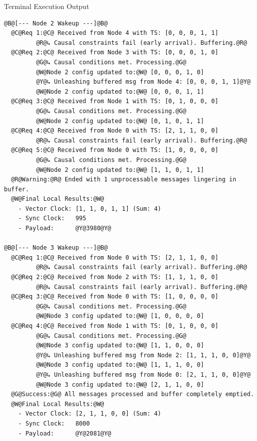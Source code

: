 \documentclass[11pt]{article}
\begin{document}
\begin{terminalbox}{Terminal Execution Output}
\begin{lstlisting}[style=terminalstyle]
@B@[--- Node 2 Wakeup ---]@B@
  @C@Req 1:@C@ Received from Node 4 with TS: [0, 0, 0, 1, 1]
         @R@↳ Causal constraints fail (early arrival). Buffering.@R@
  @C@Req 2:@C@ Received from Node 3 with TS: [0, 0, 0, 1, 0]
         @G@↳ Causal conditions met. Processing.@G@
         @W@Node 2 config updated to:@W@ [0, 0, 0, 1, 0]
         @Y@↳ Unleashing buffered msg from Node 4: [0, 0, 0, 1, 1]@Y@
         @W@Node 2 config updated to:@W@ [0, 0, 0, 1, 1]
  @C@Req 3:@C@ Received from Node 1 with TS: [0, 1, 0, 0, 0]
         @G@↳ Causal conditions met. Processing.@G@
         @W@Node 2 config updated to:@W@ [0, 1, 0, 1, 1]
  @C@Req 4:@C@ Received from Node 0 with TS: [2, 1, 1, 0, 0]
         @R@↳ Causal constraints fail (early arrival). Buffering.@R@
  @C@Req 5:@C@ Received from Node 0 with TS: [1, 0, 0, 0, 0]
         @G@↳ Causal conditions met. Processing.@G@
         @W@Node 2 config updated to:@W@ [1, 1, 0, 1, 1]
  @R@Warning:@R@ Ended with 1 unprocessable messages lingering in buffer.
  @W@Final Local Results:@W@
    - Vector Clock: [1, 1, 0, 1, 1] (Sum: 4)
    - Sync Clock:   995
    - Payload:      @Y@3980@Y@

@B@[--- Node 3 Wakeup ---]@B@
  @C@Req 1:@C@ Received from Node 0 with TS: [2, 1, 1, 0, 0]
         @R@↳ Causal constraints fail (early arrival). Buffering.@R@
  @C@Req 2:@C@ Received from Node 2 with TS: [1, 1, 1, 0, 0]
         @R@↳ Causal constraints fail (early arrival). Buffering.@R@
  @C@Req 3:@C@ Received from Node 0 with TS: [1, 0, 0, 0, 0]
         @G@↳ Causal conditions met. Processing.@G@
         @W@Node 3 config updated to:@W@ [1, 0, 0, 0, 0]
  @C@Req 4:@C@ Received from Node 1 with TS: [0, 1, 0, 0, 0]
         @G@↳ Causal conditions met. Processing.@G@
         @W@Node 3 config updated to:@W@ [1, 1, 0, 0, 0]
         @Y@↳ Unleashing buffered msg from Node 2: [1, 1, 1, 0, 0]@Y@
         @W@Node 3 config updated to:@W@ [1, 1, 1, 0, 0]
         @Y@↳ Unleashing buffered msg from Node 0: [2, 1, 1, 0, 0]@Y@
         @W@Node 3 config updated to:@W@ [2, 1, 1, 0, 0]
  @G@Success:@G@ All messages processed and buffer completely emptied.
  @W@Final Local Results:@W@
    - Vector Clock: [2, 1, 1, 0, 0] (Sum: 4)
    - Sync Clock:   8000
    - Payload:      @Y@2081@Y@


\end{lstlisting}
\end{terminalbox}
\end{document}
